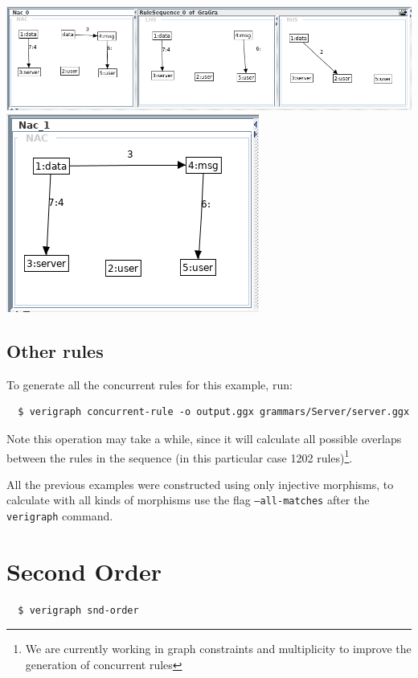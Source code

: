 \documentclass[12pt]{article}
\begin{document}
\noindent
\includegraphics[scale = 0.5]{rule-sequence_05a.png}\\
\noindent
\includegraphics[scale = 0.5]{rule-sequence_05b.png}\\

\subsection{Other rules}

To generate all the concurrent rules for this example, run:

\begin{verbatim}
  $ verigraph concurrent-rule -o output.ggx grammars/Server/server.ggx
\end{verbatim}

Note this operation may take a while, since it will calculate all possible overlaps between the rules in the sequence (in this particular case 1202 rules)\footnote{We are currently working in graph constraints and multiplicity to improve the generation of concurrent rules}.

All the previous examples were constructed using only injective morphisms, to calculate with all kinds of morphisms use the flag \texttt{--all-matches} after the \texttt{verigraph} command.

\section{Second Order}

\begin{verbatim}
  $ verigraph snd-order
\end{verbatim}


\end{document}

